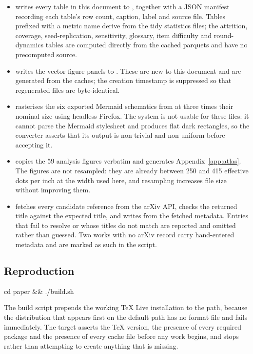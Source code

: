 \begin{itemize}
\item {} writes every table in this document to
, together with a JSON manifest recording each table's row count,
caption, label and source file. Tables prefixed with a metric name derive from the tidy
statistics files; the attrition, coverage, seed-replication, sensitivity, glossary, item
difficulty and round-dynamics tables are computed directly from the cached parquets and
have no precomputed source.
\item {} writes the vector figure panels to
. These are new to this document and are generated from the
caches; the creation timestamp is suppressed so that regenerated files are byte-identical.
\item {} rasterises the six exported Mermaid
schematics from  at three times their nominal size using
headless Firefox. The system  is not usable for these files: it cannot
parse the Mermaid stylesheet and produces flat dark rectangles, so the converter asserts
that its output is non-trivial and non-uniform before accepting it.
\item {} copies the 59 analysis figures verbatim and
generates Appendix~\ref{app:atlas}. The figures are not resampled: they are already
between 250 and 415 effective dots per inch at the width used here, and resampling
increases file size without improving them.
\item {} fetches every candidate reference from the arXiv
API, checks the returned title against the expected title, and writes  from
the fetched metadata. Entries that fail to resolve or whose titles do not match are
reported and omitted rather than guessed. Two works with no arXiv record carry hand-entered
metadata and are marked as such in the script.
\end{itemize}

\subsection{Reproduction}

\begin{promptquote}
cd paper \&\& ./build.sh
\end{promptquote}

The build script prepends the working TeX Live installation to the path, because the
distribution that appears first on the default path has no format file and fails
immediately. The  target asserts the TeX version, the presence of every
required package and the presence of every cache file before any work begins, and stops
rather than attempting to create anything that is missing.

